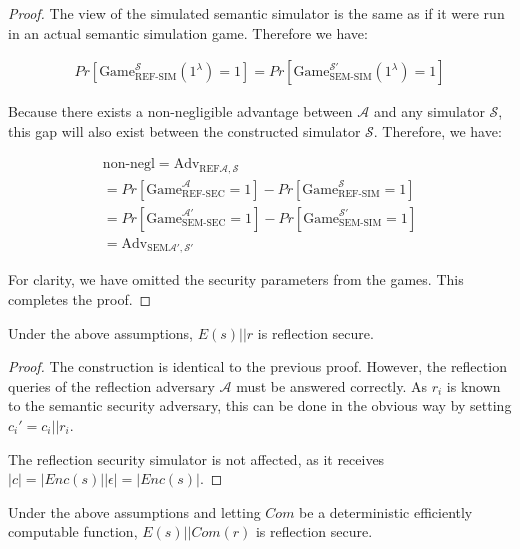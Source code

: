 \begin{proof}
    The view of the simulated semantic simulator is the same as if it were run
    in an actual semantic simulation game. Therefore we have:

    \begin{align*}
        Pr[\text{Game}_{\text{REF-SIM}}^{\mathcal{S}}(1^{\lambda})
        = 1]
        =
        Pr[\text{Game}_{\text{SEM-SIM}}^{\mathcal{S'}}(1^{\lambda})
        = 1]
    \end{align*}

    Because there exists a non-negligible advantage between $\mathcal{A}$ and
    any simulator $\mathcal{S}$, this gap will also exist between the
    constructed simulator $\mathcal{S}$. Therefore, we have:

    \begin{align*}
        \text{non-negl} = \text{Adv}_{\text{REF} \mathcal{A}, \mathcal{S}}\\
        =
        Pr[\text{Game}_{\text{REF-SEC}}^{\mathcal{A}}
        = 1] -
        Pr[\text{Game}_{\text{REF-SIM}}^{\mathcal{S}}
        = 1]\\
        =
        Pr[\text{Game}_{\text{SEM-SEC}}^{\mathcal{A'}}
        = 1]
        -
        Pr[\text{Game}_{\text{SEM-SIM}}^{\mathcal{S'}}
        = 1]\\
        =
        \text{Adv}_{\text{SEM} \mathcal{A'}, \mathcal{S'}}
    \end{align*}

    For clarity, we have omitted the security parameters from the games.
    This completes the proof.
\end{proof}

\begin{lemma}
    Under the above assumptions, $E(s) || r$ is reflection secure.
\end{lemma}

\begin{proof}
    The construction is identical to the previous proof. However, the
    reflection queries of the reflection adversary $\mathcal{A}$ must be
    answered correctly. As $r_i$ is known to the semantic security adversary,
    this can be done in the obvious way by setting $c_i' = c_i || r_i$.

    The reflection security simulator is not affected, as it receives $|c| =
    |Enc(s) || \epsilon| = |Enc(s)|$.
\end{proof}

\begin{lemma}
    Under the above assumptions and letting $Com$ be a deterministic
    efficiently computable function, $E(s) || Com(r)$ is reflection secure.
\end{lemma}

